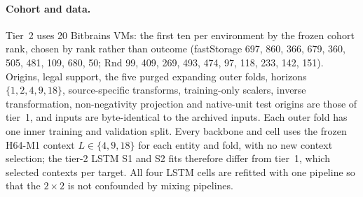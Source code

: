 \documentclass[5p,twocolumn]{elsarticle}
\begin{document}
\paragraph{Cohort and data.} Tier~2 uses 20 Bitbrains VMs: the first ten per
environment by the frozen cohort rank, chosen by rank rather than outcome
(fastStorage 697, 860, 366, 679, 360, 505, 481, 109, 680, 50; Rnd 99, 409,
269, 493, 474, 97, 118, 233, 142, 151). Origins, legal support, the five
purged expanding outer folds, horizons $\{1,2,4,9,18\}$, source-specific
transforms, training-only scalers, inverse transformation, non-negativity
projection and native-unit test origins are those of tier~1, and inputs are
byte-identical to the archived inputs. Each outer fold has one inner
training and validation split. Every backbone and cell uses the frozen H64-M1
context $L\in\{4,9,18\}$ for each entity and fold, with no new context
selection; the tier-2 LSTM S1 and S2 fits therefore differ from tier~1, which
selected contexts per target. All four LSTM cells are refitted with one
pipeline so that the $2\times2$ is not confounded by mixing pipelines.
\end{document}
